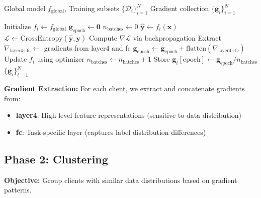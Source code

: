 \documentclass[11pt,a4paper]{article}
\begin{document}
\begin{algorithm}
\caption{Warmup Phase (Single Client Finetuning)}
\begin{algorithmic}[1]
\Require Global model $f_{\text{global}}$, Training subsets $\{\mathcal{D}_i\}_{i=1}^N$
\Ensure Gradient collection $\{\mathbf{g}_i\}_{i=1}^N$

 
    \State Initialize $f_i \gets f_{\text{global}}$ 
        \State $\mathbf{g}_{\text{epoch}} \gets \mathbf{0}$ 
        \State $n_{\text{batches}} \gets 0$
            \State $\hat{\mathbf{y}} \gets f_i(\mathbf{x})$
            \State $\mathcal{L} \gets \text{CrossEntropy}(\hat{\mathbf{y}}, \mathbf{y})$
            \State Compute $\nabla \mathcal{L}$ via backpropagation
            \State Extract $\nabla_{\text{layer4+fc}} \gets$ gradients from layer4 and fc
            \State $\mathbf{g}_{\text{epoch}} \gets \mathbf{g}_{\text{epoch}} + \text{flatten}(\nabla_{\text{layer4+fc}})$
            \State Update $f_i$ using optimizer
            \State $n_{\text{batches}} \gets n_{\text{batches}} + 1$
        \EndFor
        \State Store $\mathbf{g}_i[\text{epoch}] \gets \mathbf{g}_{\text{epoch}} / n_{\text{batches}}$
    \EndFor
\EndFor
\State \Return $\{\mathbf{g}_i\}_{i=1}^N$ 
\end{algorithmic}
\end{algorithm}

\textbf{Gradient Extraction:} For each client, we extract and concatenate gradients from:
\begin{itemize}
    \item \textbf{layer4}: High-level feature representations (sensitive to data distribution)
    \item \textbf{fc}: Task-specific layer (captures label distribution differences)
\end{itemize}

\subsection{Phase 2: Clustering}

\textbf{Objective:} Group clients with similar data distributions based on gradient patterns.
\end{document}

